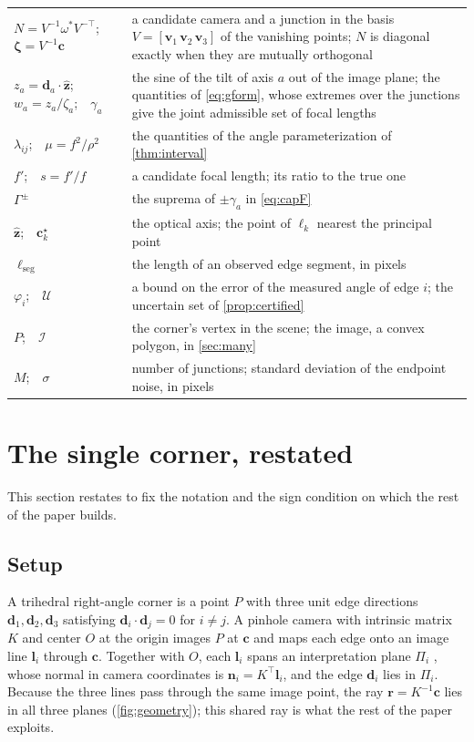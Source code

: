 \documentclass[pdflatex,sn-mathphys-num,iicol]{sn-jnl}
\newcommand{\vd}{\mathbf{d}}
\newcommand{\vr}{\mathbf{r}}
\newcommand{\vn}{\mathbf{n}}
\newcommand{\vl}{\mathbf{l}}
\newcommand{\vc}{\mathbf{c}}
\newcommand{\vv}{\mathbf{v}}
\theoremstyle{thmstyleone}
\theoremstyle{thmstylethree}
\theoremstyle{thmstyletwo}
\begin{document}
\begin{table}[t]
\begin{tabularx}{\linewidth}{@{}l >{\raggedright\arraybackslash}X@{}}
$N=V^{-1}\omega^{*}V^{-\top}$;\ \ $\boldsymbol\zeta=V^{-1}\vc$ & a candidate camera and a junction in the basis $V=[\vv_1\,\vv_2\,\vv_3]$ of the vanishing points; $N$ is diagonal exactly when they are mutually orthogonal \\
$z_a=\vd_a\cdot\hat{\mathbf z}$;\ \ $w_a=z_a/\zeta_a$;\ \ $\gamma_a$ & the sine of the tilt of axis $a$ out of the image plane; the quantities of \eqref{eq:gform}, whose extremes over the junctions give the joint admissible set of focal lengths \\
$\lambda_{ij}$;\ \ $\mu=f^2/\rho^2$ & the quantities of the angle parameterization of \cref{thm:interval} \\
$f'$;\ \ $s=f'/f$ & a candidate focal length; its ratio to the true one \\
$\Gamma^{\pm}$ & the suprema of $\pm\gamma_a$ in \eqref{eq:capF} \\
$\hat{\mathbf z}$;\ \ $\vc^{\star}_k$ & the optical axis; the point of $\ell_k$ nearest the principal point \\
$\ell_{\mathrm{seg}}$ & the length of an observed edge segment, in pixels \\
$\varphi_i$;\ \ $\mathcal U$ & a bound on the error of the measured angle of edge $i$; the uncertain set of \cref{prop:certified} \\
$P$;\ \ $\mathcal I$ & the corner's vertex in the scene; the image, a convex polygon, in \cref{sec:many} \\
$M$;\ \ $\sigma$ & number of junctions; standard deviation of the endpoint noise, in pixels \\
\bottomrule
\end{tabularx}
\end{table}


\section{The single corner, restated}\label{sec:single}

This section restates \citet[Theorem~4]{kanatani1988} to fix the notation and the sign condition on which the rest of the paper builds.

\subsection{Setup}\label{sec:setup}

A trihedral right-angle corner is a point $P$ with three unit edge directions $\vd_1,\vd_2,\vd_3$ satisfying $\vd_i\cdot\vd_j=0$ for $i\neq j$. A pinhole camera with intrinsic matrix $K$ and center $O$ at the origin images $P$ at $\vc$ and maps each edge onto an image line $\vl_i$ through $\vc$. Together with $O$, each $\vl_i$ spans an interpretation plane $\Pi_i$ \citep{barnard1983}, whose normal in camera coordinates is $\vn_i=K^{\top}\vl_i$, and the edge $\vd_i$ lies in $\Pi_i$. Because the three lines pass through the same image point, the ray $\vr=K^{-1}\vc$ lies in all three planes (\cref{fig:geometry}); this shared ray is what the rest of the paper exploits.
\end{document}
